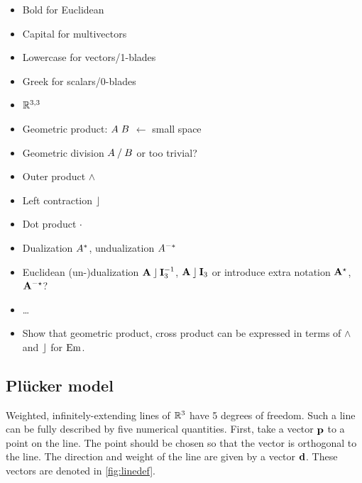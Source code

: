 \begin{itemize}
  \item Bold for Euclidean
  \item Capital for multivectors
  \item Lowercase for vectors/1-blades
  \item Greek for scalars/0-blades
  \item $\mathbb{R}^{3,3}$
  \item Geometric product: $A \; B$ $\leftarrow$ small space
  \item Geometric division $A \mathbin{/} B$ or too trivial?
  \item Outer product $\wedge$
  \item Left contraction $\mathbin{\rfloor}$
  \item Dot product $\mathbin{\cdot}$
  \item Dualization $A^\ast$, undualization $A^{-\ast}$
  \item Euclidean (un-)dualization $\mathbf{A} \mathbin{\rfloor} \mathbf{I}_3^{-1}$, $\mathbf{A} \mathbin{\rfloor} \mathbf{I}_3$ or introduce extra notation $\mathbf{A}^{\star}$, $\mathbf{A}^{-\star}$?
  \item \ldots
  \item Show that geometric product, cross product can be expressed in terms of $\wedge$ and $\mathbin{\rfloor}$ for $\operatorname{Em}$.
\end{itemize}

\subsection{Pl\"ucker model}
\label{sec:hongbo}
\label{sec:plucker}


Weighted, infinitely-extending lines of $\mathbb{R}^3$ have 5 degrees of freedom.  Such a line can be fully described by five numerical quantities. First, take a vector $\mathbf{p}$ to a point on the line.  The point should be chosen so that the vector is orthogonal to the line.  The direction and weight of the line are given by a vector $\mathbf{d}$.  These vectors are denoted in \autoref{fig:linedef}.

